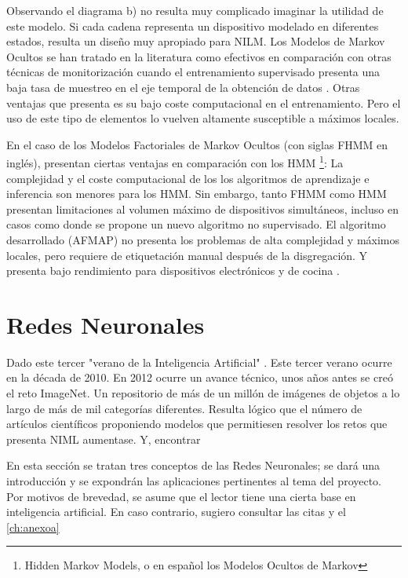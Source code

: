 
Observando el diagrama b) no resulta muy complicado imaginar la utilidad de este modelo. Si cada cadena representa un dispositivo modelado en diferentes estados, resulta un diseño muy apropiado para NILM.
Los Modelos de Markov Ocultos se han tratado en la literatura como efectivos en comparación con otras técnicas de monitorización cuando el entrenamiento supervisado presenta una baja tasa de muestreo en el eje temporal de la obtención de datos \autocite{frenchHMMNILM}.
Otras ventajas que presenta es su bajo coste computacional en el entrenamiento. Pero el uso de este tipo de elementos lo vuelven altamente susceptible a máximos locales\autocite{NILMreview2017}.

En el caso de los Modelos Factoriales de Markov Ocultos (con siglas FHMM en inglés), presentan ciertas ventajas en comparación con los HMM \footnote{Hidden Markov Models, o en español los Modelos Ocultos de Markov}:
La complejidad y el coste computacional de los los algoritmos de aprendizaje e inferencia son menores para los HMM. Sin embargo, tanto FHMM como HMM presentan limitaciones al volumen máximo de dispositivos simultáneos, incluso en casos como \autocite{afmap2012} donde se propone un nuevo algoritmo no supervisado. El algoritmo desarrollado (AFMAP) no presenta los problemas de alta complejidad y máximos locales, pero requiere de etiquetación manual después de la disgregación. Y presenta bajo rendimiento para dispositivos electrónicos y de cocina \autocite[5]{NILMreview2017}.

\section{Redes Neuronales}
Dado este tercer "verano de la Inteligencia Artificial" . Este tercer verano ocurre en la década de 2010. En 2012 ocurre un avance técnico, unos años antes se creó el reto ImageNet. Un repositorio de más de un millón de imágenes de objetos a lo largo de más de mil categorías diferentes. \autocite{Kautz_2022}
Resulta lógico que el número de artículos científicos proponiendo modelos que permitiesen resolver los retos que presenta NIML aumentase. Y, encontrar

En esta sección se tratan tres conceptos de las Redes Neuronales; se dará una introducción y se expondrán las aplicaciones pertinentes al tema del proyecto.
Por motivos de brevedad, se asume que el lector tiene una cierta base en inteligencia artificial. En caso contrario, sugiero consultar las citas y el \autoref{ch:anexoa}
